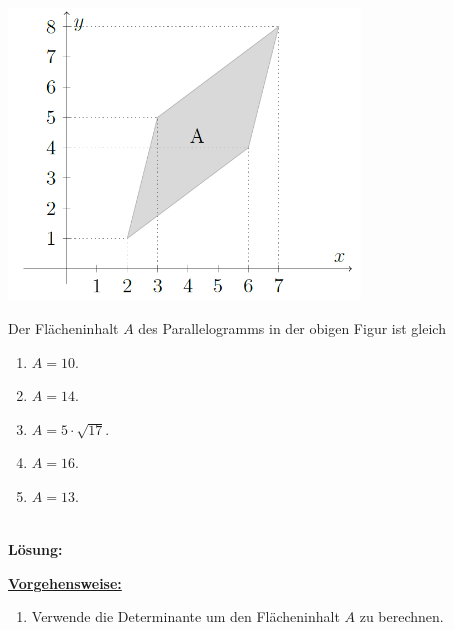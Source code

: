 \subsection*{}
\begin{center}
	\includegraphics[width=0.7\textwidth]{pictures/aufgabe2_7}
\end{center}
Der Flächeninhalt $ A $ des Parallelogramms in der obigen Figur ist gleich
\renewcommand{\labelenumi}{(\alph{enumi})}
\begin{enumerate}
	\item 
	$ A = 10 $.
	\item
	$ A = 14 $.
	\item
	$ A = 5 \cdot  \sqrt{17} $.
	\item
	$ A = 16 $.
	\item
	$ A = 13 $.
\end{enumerate}
\ \\
\textbf{Lösung:}
\begin{mdframed}
\underline{\textbf{Vorgehensweise:}}
\renewcommand{\labelenumi}{\theenumi.}
\begin{enumerate}
\item Verwende die Determinante um den Flächeninhalt $ A $ zu berechnen.
\end{enumerate}
\end{mdframed}

